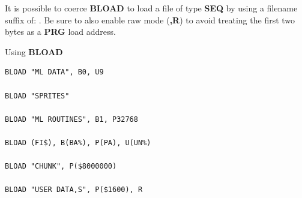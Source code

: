 \begin{description}[leftmargin=2cm,style=nextline]
                  It is possible to coerce {\bf BLOAD} to load a file of type {\bf SEQ} by using a filename suffix of: . Be sure to also enable raw mode ({\bf ,R}) to avoid treating the first two bytes as a {\bf PRG} load address.

\item [Examples:] Using {\bf BLOAD}

\begin{tcolorbox}[colback=black,coltext=white]
\verbatimfont{\codefont}
\begin{verbatim}
BLOAD "ML DATA", B0, U9

BLOAD "SPRITES"

BLOAD "ML ROUTINES", B1, P32768

BLOAD (FI$), B(BA%), P(PA), U(UN%)

BLOAD "CHUNK", P($8000000)

BLOAD "USER DATA,S", P($1600), R
\end{verbatim}
\end{tcolorbox}
\end{description}


\newpage
